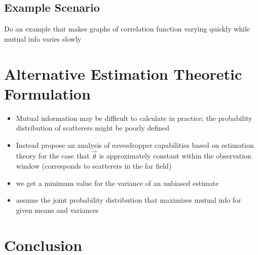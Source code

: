 \documentclass[journal]{ieeetran}
\begin{document}
\subsection{Example Scenario}

Do an example that makes graphs of correlation function varying quickly while mutual info varies slowly

\section{Alternative Estimation Theoretic Formulation}
\begin{itemize}
\item Mutual information may be difficult to calculate in practice; the probability distribution of scatterers might be poorly defined
\item Instead propose an analysis of eavesdropper capabilities based on estimation theory for the case that $\vec{\theta}$ is approximately constant within the observation window (corresponds to scatterers in the far field) \cite{kckpVTC2015}
\item we get a minimum value for the variance of an unbiased estimate
\item assume the joint probability distribution that maximizes mutual info for given means and variances
\end{itemize}

\section{Conclusion}

{}
\end{document}
